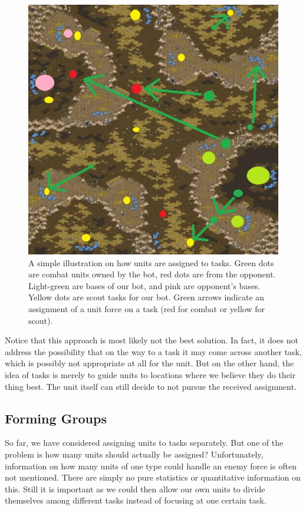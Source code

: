 \begin{figure}
\centering
\includegraphics[scale=0.4]{mapassign5.jpg}
\caption{\label{fig:mapassign} A simple illustration on how units are assigned to tasks. Green dots are combat units owned by the bot, red dots are from the opponent. Light-green are bases of our bot, and pink are opponent's bases. Yellow dots are scout tasks for our bot. Green arrows indicate an assignment of a unit force on a task (red for combat or yellow for scout).}
\end{figure}

Notice that this approach is most likely not the best solution. In fact, it does not address the possibility that on the way to a task it may come across another task, which is possibly not appropriate at all for the unit. But on the other hand, the idea of tasks is merely to guide units to locations where we believe they do their thing best. The unit itself can still decide to not pursue the received assignment.


\subsection{Forming Groups}
So far, we have considered assigning units to tasks separately. But one of the problem is how many units should actually be assigned? Unfortunately, information on how many units of one type could handle an enemy force is often not mentioned. There are simply no pure statistics or quantitative information on this. Still it is important as we could then allow our own units to divide themselves among different tasks instead of focusing at one certain task. 

